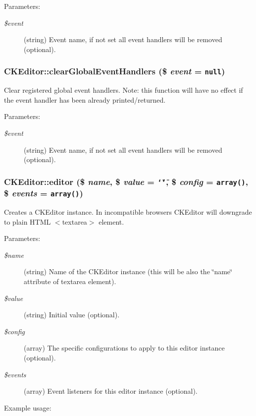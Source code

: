 \begin{Desc}
\item[Parameters:]
\begin{description}
\item[{\em \$event}](string) Event name, if not set all event handlers will be removed (optional). \end{description}
\end{Desc}
\hypertarget{classCKEditor_8eff2f69ca071cf793b719ef4ddea97e}{
\subsubsection[{clearGlobalEventHandlers}]{\setlength{\rightskip}{0pt plus 5cm}CKEditor::clearGlobalEventHandlers (\$ {\em event} = {\tt null})}}
\label{classCKEditor_8eff2f69ca071cf793b719ef4ddea97e}


Clear registered global event handlers. Note: this function will have no effect if the event handler has been already printed/returned.

\begin{Desc}
\item[Parameters:]
\begin{description}
\item[{\em \$event}](string) Event name, if not set all event handlers will be removed (optional). \end{description}
\end{Desc}
\hypertarget{classCKEditor_bd6f81ca7539169b55b8f0556bc594c6}{
\subsubsection[{editor}]{\setlength{\rightskip}{0pt plus 5cm}CKEditor::editor (\$ {\em name}, \/  \$ {\em value} = {\tt \char`\"{}\char`\"{}}, \/  \$ {\em config} = {\tt array()}, \/  \$ {\em events} = {\tt array()})}}
\label{classCKEditor_bd6f81ca7539169b55b8f0556bc594c6}


Creates a CKEditor instance. In incompatible browsers CKEditor will downgrade to plain HTML $<$textarea$>$ element.

\begin{Desc}
\item[Parameters:]
\begin{description}
\item[{\em \$name}](string) Name of the CKEditor instance (this will be also the \char`\"{}name\char`\"{} attribute of textarea element). \item[{\em \$value}](string) Initial value (optional). \item[{\em \$config}](array) The specific configurations to apply to this editor instance (optional). \item[{\em \$events}](array) Event listeners for this editor instance (optional).\end{description}
\end{Desc}
Example usage: 

